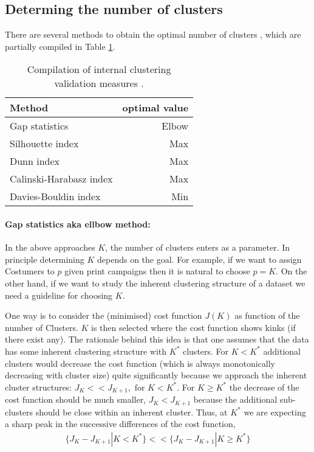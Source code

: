 \documentclass[10pt,a4paper]{article}
\begin{document}
\subsection{Determing the number of clusters}
There are several methods to obtain the optimal number of clusters \cite{Liu:2010:UIC:1933307.1934597}, which are partially compiled in Table \ref{table:internal_clustering_validation_methods}.
\begin{table}
\centering
\begin{tabular}{l r}
\hline \hline
Method & optimal value \\
\hline
Gap statistics & Elbow \\
Silhouette index		& Max \\
Dunn index				& Max \\
Calinski-Harabasz index & Max \\
Davies-Bouldin index 	& Min \\
\hline \hline

\end{tabular}
\caption{\label{table:internal_clustering_validation_methods}Compilation of internal clustering validation measures 
\cite{Liu:2010:UIC:1933307.1934597}.}
\end{table}
\paragraph{Gap statistics aka ellbow method:}
In the above approaches $K$, the number of clusters enters as a parameter.
In principle determining $K$ depends on the goal. For example, if we want to assign Costumers to $p$ given print campaigns then it is natural to choose $p=K$.  On the other hand, if we want to study the inherent clustering structure of a dataset we need a guideline for choosing $K$. 


One way is to consider the (minimised) cost function $J(K)$ as function of the number of Clusters. $K$ is then selected where the cost function shows kinks (if there exist any).
The rationale behind this idea is that one assumes that the data has some inherent clustering structure with $K^*$ clusters. For $K<K^*$ additional clusters would decrease the cost function (which is always monotonically decreasing with cluster size)  quite significantly because we approach the inherent cluster structures: $J_K<< J_{K+1}, \text{ for }  K < K^*$. For $K\geq K^* $ the decrease of the cost function should be much smaller, $J_K <J_{K+1}$  because  the additional sub-clusters should be close within an inherent cluster. Thus, at $K^*$ we are expecting a sharp peak in the successive differences of the cost function,  
\begin{align}
\{J_K - J_{K+1} | K<K^* \} <<  \{J_K - J_{K+1} | K \geq K^*\}
\end{align}
\end{document}
